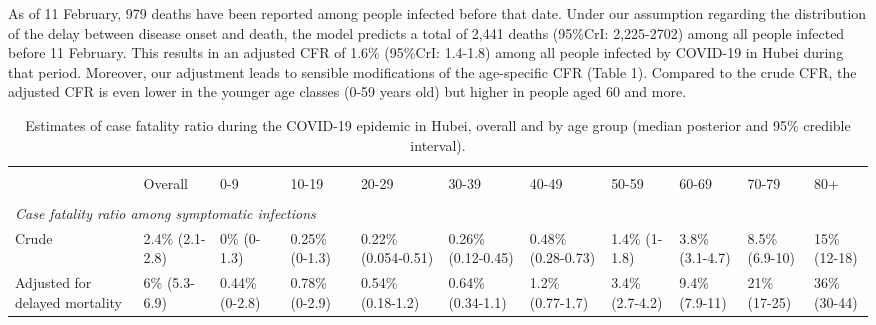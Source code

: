 \documentclass{article}
\begin{document}
As of 11 February, 979 deaths have been reported among people infected before that date. Under our assumption regarding the distribution of the delay between disease onset and death, the model predicts a total of 2,441 deaths (95\%CrI: 2,225-2702) among all people infected before 11 February. This results in an adjusted CFR of 1.6\% (95\%CrI: 1.4-1.8) among all people infected by COVID-19 in Hubei during that period. Moreover, our adjustment leads to sensible modifications of the age-specific CFR (Table 1). Compared to the crude CFR, the adjusted CFR is even lower in the younger age classes (0-59 years old) but higher in people aged 60 and more. 


\begin{table}
	\caption{Estimates of case fatality ratio during the COVID-19 epidemic in Hubei, overall and by age group (median posterior and 95\% credible interval).}
	\vspace{.5em}
	
	\begin{tabular}{p{3.5cm}p{1.8cm}p{1.8cm}p{1.8cm}p{1.8cm}p{1.8cm}p{1.6cm}p{1.5cm}p{1.5cm}p{1.5cm}p{1.5cm}}
		
		\hline\\[-.8em]
		& Overall         & 0-9                & 10-19             & 20-29                & 30-39               & 40-49              & 50-59            & 60-69           & 70-79           & 80+          \\[.1em]
		\hline \\[-.8em]
		\multicolumn{10}{l}{\textit{Case fatality ratio among symptomatic infections}} \\[.4em]
		Crude & 2.4\%\hspace{4em} (2.1-2.8) & 0\%\hspace{4em} (0-1.3)        & 0.25\%\hspace{4em} (0-1.3)    & 0.22\%\hspace{4em} (0.054-0.51)  & 0.26\%\hspace{4em} (0.12-0.45)  & 0.48\%\hspace{4em} (0.28-0.73) & 1.4\%\hspace{4em} (1-1.8)    & 3.8\%\hspace{4em} (3.1-4.7) & 8.5\%\hspace{4em} (6.9-10)  & 15\%\hspace{4em} (12-18) \\[.4em]
		
		Adjusted for delayed mortality & 6\%\hspace{4em} (5.3-6.9)   & 0.44\%\hspace{4em} (0-2.8)     & 0.78\%\hspace{4em} (0-2.9)    & 0.54\%\hspace{4em} (0.18-1.2)    & 0.64\%\hspace{4em} (0.34-1.1)   & 1.2\%\hspace{4em} (0.77-1.7)   & 3.4\%\hspace{4em} (2.7-4.2)  & 9.4\%\hspace{4em} (7.9-11)  & 21\%\hspace{4em} (17-25)    & 36\%\hspace{4em} (30-44) \\[.4em]
		

\end{tabular}
\end{table}
\end{document}
